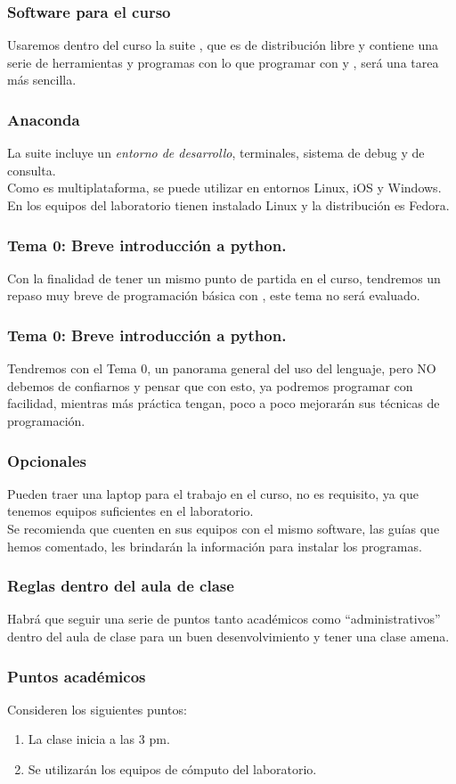 \documentclass[12pt]{beamer}
\begin{document}
\begin{frame}
\frametitle{Software para el curso}
Usaremos dentro del curso la suite , que es de distribución libre y contiene una serie de herramientas y programas con lo que programar con \textoazul{\python} y , será una tarea más sencilla.
\end{frame}
\begin{frame}
\frametitle{Anaconda}
La suite incluye un \emph{entorno de desarrollo}, terminales, sistema de debug y de consulta.
\\
\bigskip
Como es multiplataforma, se puede utilizar en entornos Linux, iOS y Windows. En los equipos del laboratorio tienen instalado Linux y la distribución es Fedora.
\end{frame}
\begin{frame}
\frametitle{Tema 0: Breve introducción a python.}
Con la finalidad de tener un mismo punto de partida en el curso, tendremos un repaso muy breve de programación básica con \python, este tema no será evaluado.
\end{frame}
\begin{frame}
\frametitle{Tema 0: Breve introducción a python.}
Tendremos con el Tema 0, un panorama general del uso del lenguaje, pero NO debemos de confiarnos y pensar que con esto, ya podremos programar con facilidad, mientras más práctica tengan, poco a poco mejorarán sus técnicas de programación.
\end{frame}
\begin{frame}
\frametitle{Opcionales}
Pueden traer una laptop para el trabajo en el curso, no es requisito, ya que tenemos equipos suficientes en el laboratorio.
\\
\medskip
\pause
Se recomienda que cuenten en sus equipos con el mismo software, las guías que hemos comentado, les brindarán la información para instalar los programas.
\end{frame}
\begin{frame}
\frametitle{Reglas dentro del aula de clase}
Habrá que seguir una serie de puntos tanto académicos como \enquote{administrativos} dentro del aula de clase para un buen desenvolvimiento y tener una clase amena. 
\end{frame}
\begin{frame}
\frametitle{Puntos académicos}
Consideren los siguientes puntos:
\begin{enumerate}[<+->]
\item La clase inicia a las 3 pm.
\item Se utilizarán los equipos de cómputo del laboratorio.
\seti
\end{enumerate}
\end{frame}
\end{document}
